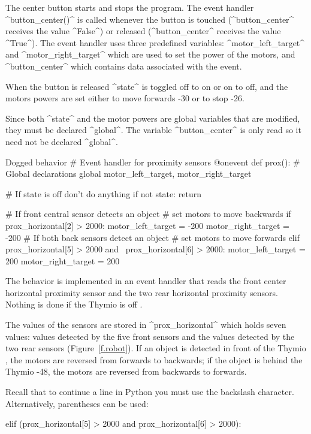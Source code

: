 \documentclass[11pt,a4paper]{article}
\newcommand*{\li}[1]{{\footnotesize\textsf{\ddag #1}}}
\begin{document}
The center button starts and stops the program. The event handler ^button_center()^ \li{16} is called whenever the button is touched (^button_center^ receives the value ^False^) or released (^button_center^ receives the value ^True^). The event handler uses three predefined variables: ^motor_left_target^ and ^motor_right_target^ which are used to set the power of the motors, and ^button_center^ \li{22} which contains data associated with the event. 

When the button is released ^state^ is toggled off to on or on to off, and the motors powers are set either to move forwards \li{29-30} or to stop \li{25-26}.

Since both ^state^ and the motor powers are global variables that are modified, they must be declared ^global^. The variable ^button_center^ is only read so it need not be declared ^global^.

\newpage

\begin{proglnn}{Dogged behavior}
# Event handler for proximity sensors
@onevent
def prox():
    # Global declarations
    global motor_left_target, motor_right_target

    # If state is off don't do anything
    if not state: return

    # If front central sensor detects an object
    #   set motors to move backwards
    if prox_horizontal[2] > 2000:
        motor_left_target = -200
        motor_right_target = -200
    # If both back sensors detect an object
    #   set motors to move forwards
    elif prox_horizontal[5] > 2000 and \
         prox_horizontal[6] > 2000:
        motor_left_target = 200
        motor_right_target = 200
\end{proglnn}

The behavior is implemented in an event handler that reads the front center horizontal proximity sensor and the two rear horizontal proximity sensors. Nothing is done if the Thymio is off \li{38}.

The values of the sensors are stored in ^prox_horizontal^ which holds seven values: values detected by the five front sensors and the values detected by the two rear sensors (Figure~\ref{f.robot}). If an object is detected in front of the Thymio \li{42}, the motors are reversed from forwards to backwards; if the object is behind the Thymio \li{47-48}, the motors are reversed from backwards to forwards.

Recall that to continue a line in Python \li{47} you must use the backslash character. Alternatively, parentheses can be used:
\begin{prog}
    elif (prox_horizontal[5] > 2000 and
            prox_horizontal[6] > 2000):
\end{prog}
\end{document}
